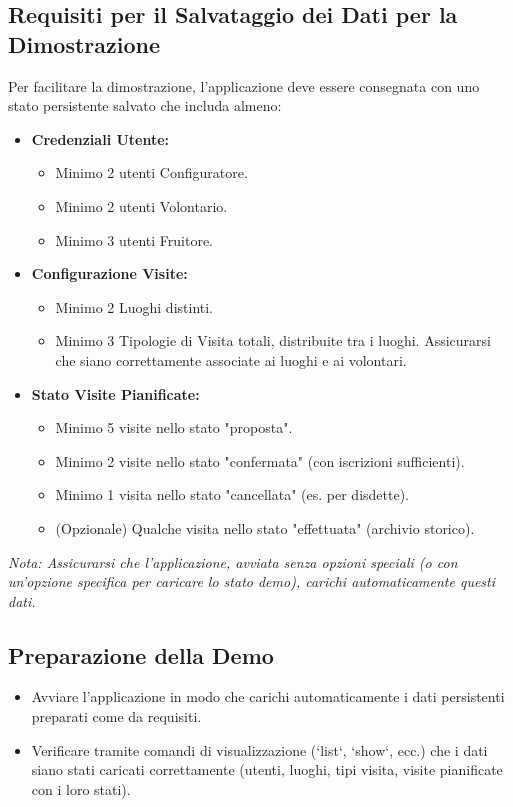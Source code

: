 \documentclass[a4paper,12pt]{article}
\begin{document}
\subsection{Requisiti per il Salvataggio dei Dati per la Dimostrazione}
Per facilitare la dimostrazione, l'applicazione deve essere consegnata con uno stato persistente salvato che includa almeno:
\begin{itemize}
    \item \textbf{Credenziali Utente:}
        \begin{itemize}
            \item Minimo 2 utenti Configuratore.
            \item Minimo 2 utenti Volontario.
            \item Minimo 3 utenti Fruitore.
        \end{itemize}
    \item \textbf{Configurazione Visite:}
        \begin{itemize}
            \item Minimo 2 Luoghi distinti.
            \item Minimo 3 Tipologie di Visita totali, distribuite tra i luoghi. Assicurarsi che siano correttamente associate ai luoghi e ai volontari.
        \end{itemize}
    \item \textbf{Stato Visite Pianificate:}
        \begin{itemize}
            \item Minimo 5 visite nello stato "proposta".
            \item Minimo 2 visite nello stato "confermata" (con iscrizioni sufficienti).
            \item Minimo 1 visita nello stato "cancellata" (es. per disdette).
            \item (Opzionale) Qualche visita nello stato "effettuata" (archivio storico).
        \end{itemize}
\end{itemize}
\textit{Nota: Assicurarsi che l'applicazione, avviata senza opzioni speciali (o con un'opzione specifica per caricare lo stato demo), carichi automaticamente questi dati.}

\subsection{Preparazione della Demo}
\begin{itemize}
    \item Avviare l'applicazione in modo che carichi automaticamente i dati persistenti preparati come da requisiti.
    \item Verificare tramite comandi di visualizzazione (`list`, `show`, ecc.) che i dati siano stati caricati correttamente (utenti, luoghi, tipi visita, visite pianificate con i loro stati).
\end{itemize}
\end{document}
